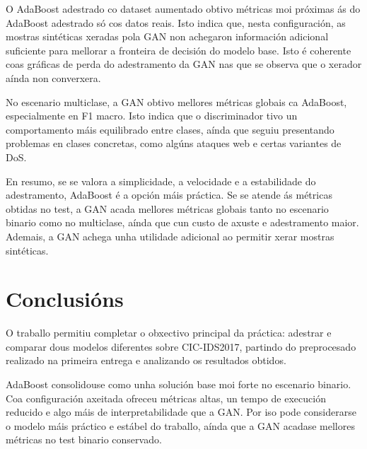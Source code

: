 \documentclass[12pt,a4paper]{article}
\begin{document}
O AdaBoost adestrado co dataset aumentado obtivo métricas moi próximas ás do
AdaBoost adestrado só cos datos reais. Isto indica que,
nesta configuración, as mostras sintéticas xeradas pola GAN non achegaron
información adicional suficiente para mellorar a fronteira de decisión do
modelo base. Isto é coherente coas gráficas de perda do adestramento da GAN nas que se observa que o xerador aínda non converxera.

\begin{table}[H]
\centering
\small
{}
\caption{Comparativa cuantitativa no escenario multiclase sobre test}
\end{table}

No escenario multiclase, a GAN obtivo mellores métricas globais ca AdaBoost,
especialmente en F1 macro. Isto indica que o discriminador tivo un comportamento
máis equilibrado entre clases, aínda que seguiu presentando problemas en clases
concretas, como algúns ataques web e certas variantes de DoS.

En resumo, se se valora a simplicidade, a velocidade e a estabilidade do
adestramento, AdaBoost é a opción máis práctica. Se se atende ás métricas
obtidas no test, a GAN acada mellores métricas globais tanto no escenario binario
como no multiclase, aínda que cun custo de axuste e adestramento maior.
Ademais, a GAN achega unha utilidade adicional ao permitir xerar mostras
sintéticas.

\section{Conclusións}

O traballo permitiu completar o obxectivo principal da práctica: adestrar e
comparar dous modelos diferentes sobre CIC-IDS2017, partindo do preprocesado
realizado na primeira entrega e analizando os resultados obtidos.

AdaBoost consolidouse como unha solución base moi forte no escenario binario.
Coa configuración axeitada ofreceu métricas altas, un tempo de execución
reducido e algo máis de interpretabilidade que a GAN. Por iso pode considerarse
o modelo máis práctico e estábel do traballo, aínda que a GAN acadase mellores
métricas no test binario conservado.
\end{document}
